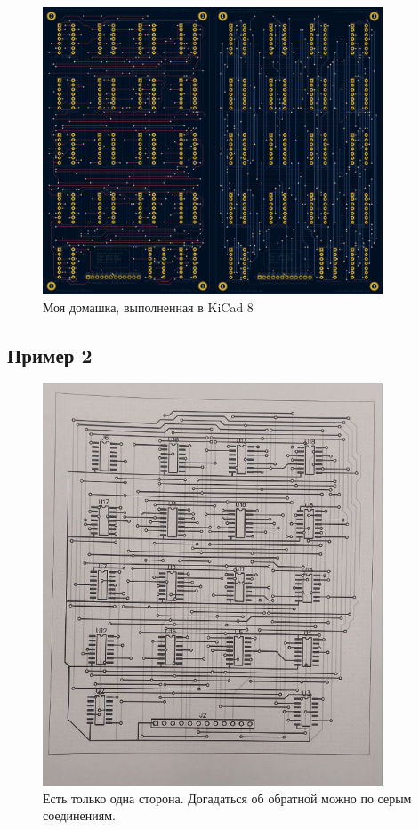 \documentclass[a4paper, 12pt]{article}
\begin{document}
\newpage
\begin{figure}[h!]
	\centering
	\includegraphics[width=0.9\textwidth]{docs/myhw2.png}
	\caption{Моя домашка, выполненная в KiCad 8}
\end{figure}

\newpage
\subsection{Пример 2}
\begin{figure}[h!]
	\centering
	\includegraphics[width=0.9\textwidth]{docs/ex1.png}
	\caption{Есть только одна сторона. Догадаться об обратной можно по серым соединениям.}
\end{figure}
\end{document}
